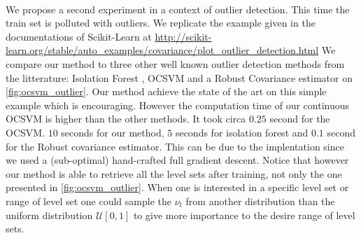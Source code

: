 \paragraph{}
We propose a second experiment in a context of outlier detection. This time 
the train set is polluted with outliers. We replicate the example given in
the documentations of Scikit-Learn at
\url{http://scikit-learn.org/stable/auto_examples/covariance/plot_outlier_detection.html}
We compare our method to three other well known outlier detection methods
from the litterature: Isolation Forest \citep{Liu2008}, \acs{OCSVM}
\citep{Scholkopf2001} and a Robust Covariance estimator
\citep{campbell1980robust, pedregosa2011scikit} on \cref{fig:ocsvm_outlier}.
Our method achieve the state of the art on this simple example which is
encouraging. However the computation time of our continuous \acs{OCSVM} is
higher than the other methods. It took circa $0.25$ second for the \acs{OCSVM}.
$10$ seconds for our method, $5$ seconds for isolation forest and $0.1$ second
for the Robust covariance estimator. This can be due to the implentation since we used
a (sub-optimal) hand-crafted full gradient descent. Notice that however our
method is able to retrieve all the level sets after training, not only the one
presented in \cref{fig:ocsvm_outlier}.  When one is interested in a specific
level set or range of level set one could sample the $\nu_t$ from another
distribution than the uniform distribution $\mathcal{U}[0, 1]$ to give more
importance to the desire range of level sets.



